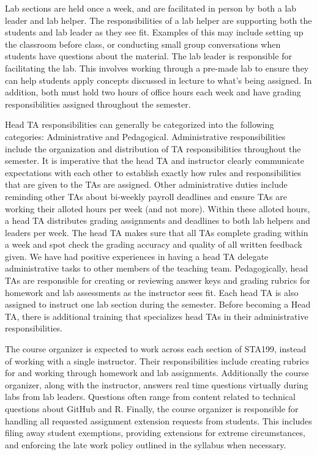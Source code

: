 \documentclass[
  12pt]{article}
\begin{document}
Lab sections are held once a week, and are facilitated in person by both
a lab leader and lab helper. The responsibilities of a lab helper are
supporting both the students and lab leader as they see fit. Examples of
this may include setting up the classroom before class, or conducting
small group conversations when students have questions about the
material. The lab leader is responsible for facilitating the lab. This
involves working through a pre-made lab to ensure they can help students
apply concepts discussed in lecture to what's being assigned. In
addition, both must hold two hours of office hours each week and have
grading responsibilities assigned throughout the semester.

Head TA responsibilities can generally be categorized into the following
categories: Administrative and Pedagogical. Administrative
responsibilities include the organization and distribution of TA
responsibilities throughout the semester. It is imperative that the head
TA and instructor clearly communicate expectations with each other to
establish exactly how rules and responsibilities that are given to the
TAs are assigned. Other administrative duties include reminding other
TAs about bi-weekly payroll deadlines and ensure TAs are working their
alloted hours per week (and not more). Within these alloted hours, a
head TA distributes grading assignments and deadlines to both lab
helpers and leaders per week. The head TA makes sure that all TAs
complete grading within a week and spot check the grading accuracy and
quality of all written feedback given. We have had positive experiences
in having a head TA delegate administrative tasks to other members of
the teaching team. Pedagogically, head TAs are responsible for creating
or reviewing answer keys and grading rubrics for homework and lab
assessments as the instructor sees fit. Each head TA is also assigned to
instruct one lab section during the semester. Before becoming a Head TA,
there is additional training that specializes head TAs in their
administrative responsibilities.

The course organizer is expected to work across each section of STA199,
instead of working with a single instructor. Their responsibilities
include creating rubrics for and working through homework and lab
assignments. Additionally the course organizer, along with the
instructor, answers real time questions virtually during labs from lab
leaders. Questions often range from content related to technical
questions about GitHub and R. Finally, the course organizer is
responsible for handling all requested assignment extension requests
from students. This includes filing away student exemptions, providing
extensions for extreme circumstances, and enforcing the late work policy
outlined in the syllabus when necessary.
\end{document}
